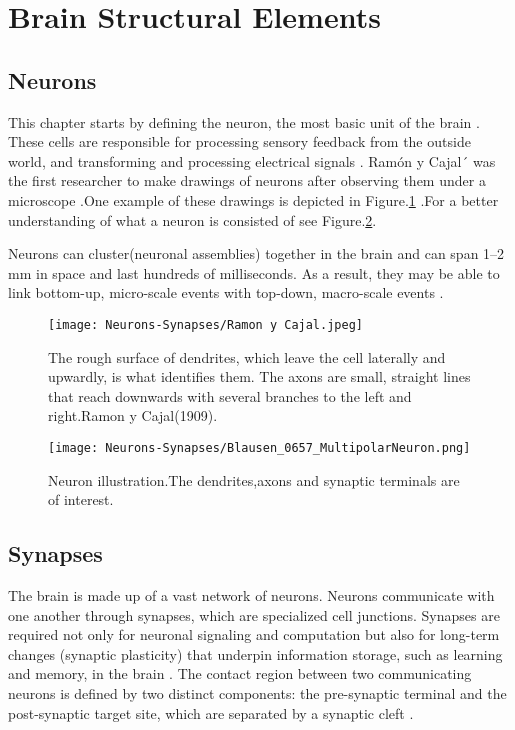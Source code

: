 \documentclass[12pt]{report}
\begin{document}
\section{Brain Structural Elements}
\subsection{Neurons}
This chapter starts by defining the neuron, the most basic unit of the brain \cite{gerstner2014}. These cells are responsible for processing sensory feedback from the outside world, and transforming and processing electrical signals \cite{balduzzi2013}. Ramón y Cajal´ was the first researcher to make drawings of neurons after observing them under a microscope\cite{garcialopezp2010}
.One example of these drawings is depicted in Figure.\ref{fig:neurons-ramoncajal} .For a better understanding of what a neuron is consisted of see Figure.\ref{fig:neurons-multipolar}.

Neurons can cluster(neuronal assemblies) together in the brain and can span 1–2 mm in space and last hundreds of milliseconds. As a result, they may be able to link bottom-up, micro-scale events with top-down, macro-scale events \cite{Badin2017} .

\begin{figure}[htp]
    \centering
    \texttt{[image: Neurons-Synapses/Ramon y Cajal.jpeg]}
    \caption{The rough surface of dendrites, which leave the cell laterally and upwardly, is what identifies them. The axons are small, straight lines that reach downwards with several branches to the left and right.Ramon y Cajal(1909).}
    \label{fig:neurons-ramoncajal}
\end{figure}
\begin{figure}[htp]
    \centering
    \texttt{[image: Neurons-Synapses/Blausen\_0657\_MultipolarNeuron.png]}
    \caption{Neuron illustration.The dendrites,axons and synaptic terminals are of interest.}
    \label{fig:neurons-multipolar}
\end{figure}
\subsection{Synapses}
The brain is made up of a vast network of neurons. Neurons communicate with one another through synapses, which are specialized cell junctions. Synapses are required not only for neuronal signaling and computation but also for long-term changes (synaptic plasticity) that underpin information storage, such as learning and memory, in the brain  \cite{li2003}. The contact region between two communicating neurons is defined by two distinct components: the pre-synaptic terminal and the post-synaptic target site, which are separated by a synaptic cleft .
\end{document}
